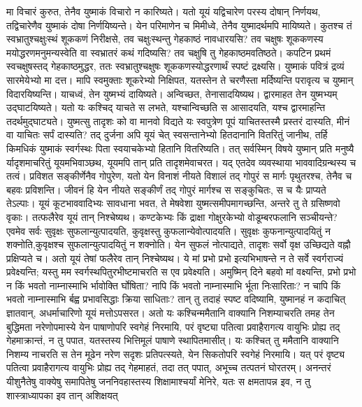 \adhyAya
{}
\vakya मा विचारं कुरुत, तेनैव युष्माकं विचारो न कारिष्यते।
\vakya यतो यूयं यद्विचारेण परस्य दोषान् निर्णयथ, तद्विचारेणैव युष्माकं दोषा निर्णयिष्यन्ते।
\vakya येन परिमाणेन च मिमीध्वे, तेनैव युष्मादर्थमपि मायिष्यते।
\vakya कुतश्च तं स्वभ्रातुश्चक्षुःस्थं शूककणं निरीक्षसे, तव चक्षुःस्थन्तु गेहकाष्ठं नावधारयसि? तव चक्षुषः शूककणस्य मयोद्धरणमनुमन्यस्वेति वा स्वभ्रातरं कथं गदिष्यसि? तव चक्षुषि तु गेहकाष्ठमवतिष्ठते।
\vakya कपटिन प्रथमं स्वचक्षुषस्तद् गेहकाष्ठमुद्धर, ततः स्वभ्रातुश्चक्षुषः शूककणस्योद्धरणार्थं स्पष्टं द्रक्ष्यसि।
\vakya युष्माकं पवित्रं द्रव्यं सारमेयेभ्यो मा दत्त। मापि स्वमुक्ताः शूकरेभ्यो निक्षिपत, यतस्तेन ते चरणैस्ता मर्दिष्यन्ति परावृत्य च युष्मान् विदारयिष्यन्ति।
\vakya याचध्वं, तेन युष्मभ्यं दायिष्यते। अन्विच्छत, तेनासादयिष्यथ। द्वारमाहत तेन युष्मभ्यम् उद्घाटयिष्यते।
\vakya यतो यः कश्चिद् याचते स लभते, यश्चान्विच्छति स आसादयति, यश्च द्वारमाहन्ति तदर्थमुद्घाट्यते।
\vakya युष्मत्सु तादृशः को वा मानवो विद्यते यः स्वपुत्रेण पूपं याचितस्तस्मै प्रस्तरं दास्यति,
\vakya मीनं वा याचितः सर्पं दास्यति?
\vakya तद् दुर्जना अपि यूयं चेत् स्वसन्तानेभ्यो हितदानानि वितरितुं जानीथ, तर्हि किमधिकं युष्माकं स्वर्गस्थः पिता स्वयाचकेभ्यो हितानि वितरिष्यति।
\vakya तत् सर्वस्मिन् विषये युष्मान् प्रति मनुष्यै र्यादृशमाचरितुं यूयमभिवाञ्छथ, यूयमपि तान् प्रति तादृशमेवाचरत। यद् एतदेव व्यवस्थाया भाववादिग्रन्थस्य च तत्वं।
\vakya प्रविशत सङ्कीर्णेनैव गोपुरेण, यतो येन विनाशं नीयते विशालं तद् गोपुरं स मार्गः पृथुतरश्च, तेनैव च बहवः प्रविशन्ति।
\vakya जीवनं हि येन नीयते सङ्कीर्णं तद् गोपुरं मार्गश्च स सङ्कुचितः, स च यैः प्राप्यते तेऽल्पाः।
\vakya यूयं कूटभाववादिभ्यः सावधाना भवत, ते मेषवेशा युष्मत्समीपमागच्छन्ति, अन्तरे तु ते ग्रसिष्णवो वृकाः।
\vakya तत्फलैरेव यूयं तान् निश्चेष्यथ। कण्टकेभ्यः किं द्राक्षा गोक्षुरकेभ्यो वोडूम्बरफलानि सञ्चीयन्ते?
\vakya एवमेव सर्वः सुवृक्षः सुफलान्युत्पादयति, कुवृक्षस्तु कुफलान्येवोत्पादयति।
\vakya सुवृक्षः कुफनान्युत्पादयितुं न शक्नोति,कुवृक्षश्च सुफलान्युत्पादयितुं न शक्नोति।
\vakya येन सुफलं नोत्पाद्यते, तादृशः सर्वो वृक्ष उच्छिद्यते वह्नौ प्रक्षिप्यते च।
\vakya अतो यूयं तेषां फलैरेव तान् निश्चेष्यथ।
\vakya ये मां प्रभो प्रभो इत्यभिभाषन्ते न ते सर्वे स्वर्गराज्यं प्रवेक्ष्यन्ति; यस्तु मम स्वर्गस्थपितुरभीष्टमाचरति स एव प्रवेक्ष्यति।
\vakya अमुष्मिन् दिने बहवो मां वक्ष्यन्ति, प्रभो प्रभो न किं भवतो नाम्नास्माभि र्भावोक्ति र्घोषिता? नापि किं भवतो नाम्नास्माभि र्भूता निःसारिताः? न चापि किं भवतो नाम्नास्माभि र्बह्व प्रभावसिद्धाः क्रिया साधिताः?
\vakya तान् तु तदाहं स्पष्ट वदिष्यामि, युष्मानहं न कदाचित् ज्ञातवान्, अधर्माचारिणो यूयं मत्तोऽपसरत।
\vakya अतो यः कश्चिन्ममैतानि वाक्यानि निशम्याचरति तमह तेन बुद्धिमता नरेणोपमास्ये येन पाषाणोपरि स्वगेहं निरमायि,
\vakya परं वृष्ट्या पतित्वा प्रवाहैरागत्य वायुभिः प्रोह्य तद् गेहमाक्रान्तं, न तु पपात, यतस्तस्य भित्तिमूलं पाषाणे स्थापितमासीत्।
\vakya यः कश्चित् तु ममैतानि वाक्यानि निशम्य नाचरति स तेन मूढेन नरेण सदृशः प्रतिपत्स्यते, येन सिकतोपरि स्वगेहं निरमायि।
\vakya यत् परं वृष्ट्य पतित्वा प्रवाहैरागत्य वायुभिः प्रोह्य तद् गेहमाहतं, तदा तत् पपात्, अभूच्च तत्पतनं घोरतरम्।
\vakya अनन्तरं यीशुनैतेषु वाक्येषु समापितेषु जननिवहास्तस्य शिक्षामाश्चर्यां मेनिरे, यतः स क्षमतापन्न इव, न तु शास्त्राध्यापका इव तान् अशिक्षयत्\eoc